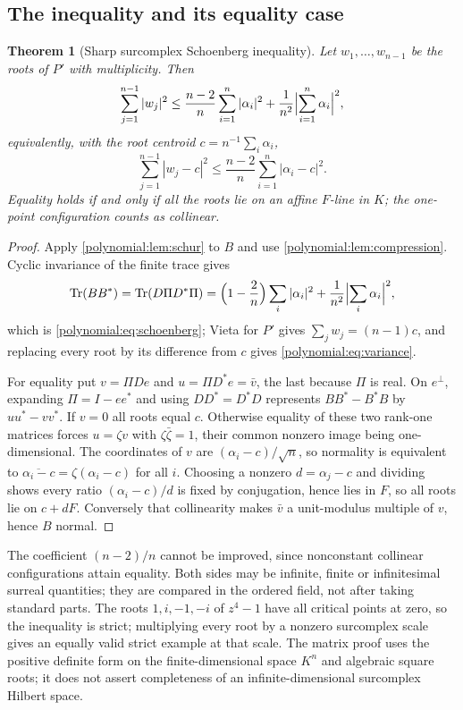 \documentclass[11pt,letterpaper]{article}
\numberwithin{equation}{section}
\newtheorem{theorem}{Theorem}[section]
\theoremstyle{definition}
\theoremstyle{remark}\newtheorem{remark}[theorem]{Remark}
\newcommand{\Tr}{\operatorname{Tr}}
\begin{document}
\subsection{The inequality and its equality case}
\begin{theorem}[Sharp surcomplex Schoenberg inequality]\label{polynomial:thm:schoenberg}
Let $w_1,\ldots,w_{n-1}$ be the roots of $P'$ with multiplicity. Then
\begin{equation}\label{polynomial:eq:schoenberg}
 \sum_{j=1}^{n-1}|w_j|^2\le\frac{n-2}{n}\sum_{i=1}^n|\alpha_i|^2
 +\frac1{n^2}\Bigl|\sum_{i=1}^n\alpha_i\Bigr|^2 ,
\end{equation}
equivalently, with the root centroid $c=n^{-1}\sum_i\alpha_i$,
\begin{equation}\label{polynomial:eq:variance}
 \boxed{\displaystyle
 \sum_{j=1}^{n-1}|w_j-c|^2\le\frac{n-2}{n}\sum_{i=1}^n|\alpha_i-c|^2 .}
\end{equation}
Equality holds if and only if all the roots lie on an affine $F$-line in $K$;
the one-point configuration counts as collinear.
\end{theorem}
\begin{proof}
Apply \cref{polynomial:lem:schur} to $B$ and use
\cref{polynomial:lem:compression}. Cyclic invariance of the finite trace gives
\[
 \Tr(BB^*)=\Tr(D\Pi D^*\Pi)
 =\Bigl(1-\frac2n\Bigr)\sum_i|\alpha_i|^2
 +\frac1{n^2}\Bigl|\sum_i\alpha_i\Bigr|^2 ,
\]
which is \eqref{polynomial:eq:schoenberg}; Vieta for $P'$ gives
$\sum_jw_j=(n-1)c$, and replacing every root by its difference from $c$ gives
\eqref{polynomial:eq:variance}.

For equality put $v=\Pi De$ and $u=\Pi D^*e=\bar v$, the last because $\Pi$ is
real. On $e^\perp$, expanding $\Pi=I-ee^*$ and using $DD^*=D^*D$ represents
$BB^*-B^*B$ by $uu^*-vv^*$. If $v=0$ all roots equal $c$. Otherwise equality
of these two rank-one matrices forces $u=\zeta v$ with $\zeta\bar\zeta=1$,
their common nonzero image being one-dimensional. The coordinates of $v$ are
$(\alpha_i-c)/\sqrt n$, so normality is equivalent to
$\overline{\alpha_i-c}=\zeta(\alpha_i-c)$ for all $i$. Choosing a nonzero
$d=\alpha_j-c$ and dividing shows every ratio $(\alpha_i-c)/d$ is fixed by
conjugation, hence lies in $F$, so all roots lie on $c+dF$. Conversely that
collinearity makes $\bar v$ a unit-modulus multiple of $v$, hence $B$ normal.
\end{proof}

The coefficient $(n-2)/n$ cannot be improved, since nonconstant collinear
configurations attain equality. Both sides may be infinite, finite or
infinitesimal surreal quantities; they are compared in the ordered field, not
after taking standard parts. The roots $1,i,-1,-i$ of $z^4-1$ have all
critical points at zero, so the inequality is strict; multiplying every root
by a nonzero surcomplex scale gives an equally valid strict example at that
scale. The matrix proof uses the positive definite form on the
finite-dimensional space $K^n$ and algebraic square roots; it does not assert
completeness of an infinite-dimensional surcomplex Hilbert space.
\end{document}
